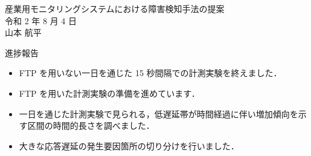 \documentclass[a4j]{jarticle}
\begin{document}
\begin{table}[t]
\begin{center}
{\large 産業用モニタリングシステムにおける障害検知手法の提案}\\
令和 2 年 8 月 4 日\\
山本 航平
\end{center}
\end{table}

進捗報告
\begin{itemize}
\item FTP を用いない一日を通じた 15 秒間隔での計測実験を終えました．
\item FTP を用いた計測実験の準備を進めています．
\item 一日を通じた計測実験で見られる，低遅延帯が時間経過に伴い増加傾向を示す区間の時間的長さを調べました．
\item 大きな応答遅延の発生要因箇所の切り分けを行いました．
\end{itemize}
\end{document}
